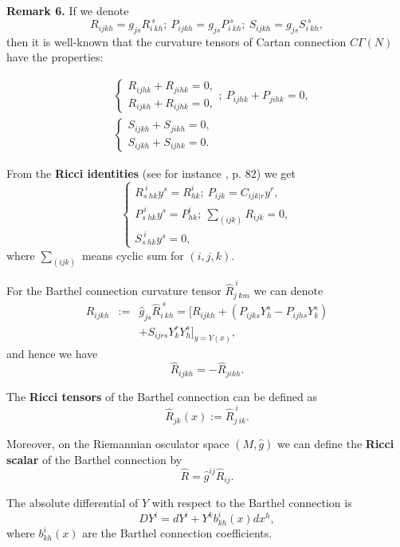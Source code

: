 \documentclass[aps,superscriptaddress, showpacs,preprintnumbers, superscriptaddress, nofootinbibt,twocolumn]{revtex4-2}
\def\bea{\begin{eqnarray}}
\def\eea{\end{eqnarray}}
\begin{document}
{\bf Remark 6.}
If we denote
$$
R_{ijkh}=g_{js}R_{i\ kh}^{\ s};\ P_{ijkh}=g_{js}P_{i\ kh}^{\ s};
\ S_{ijkh}=g_{js}S_{i\ kh}^{\ s},
$$
then it is well-known that the curvature tensors of Cartan connection $C\Gamma(N)$ have the properties:

\begin{equation*}
\begin{split}
&\begin{cases}
R_{ijhk}+R_{jihk}=0,\\
R_{ijkh}+R_{ijhk}=0,
\end{cases};\
P_{ijhk}+P_{jihk}=0,\\
&\begin{cases}
S_{ijkh}+S_{jikh}=0,\\
S_{ijkh}+S_{ijhk}=0.
\end{cases}
\end{split}
\end{equation*}

From the {\bf Ricci identities} (see for instance \cite{Ing3}, p. 82) we get
\begin{equation*}
\begin{cases}
R_{s\ hk}^{\ i}y^s=R_{hk}^i; \ P_{ijk}=C_{ijk|r}y^r,\\
P_{s\ hk}^{\ i}y^s=P_{hk}^i;\ \sum_{(ijk)}R_{ijk}=0,\\
S_{s\ hk}^{\ i}y^s=0,
\end{cases}
\end{equation*}
where $\sum_{(ijk)}$ means cyclic sum for $(i,j,k)$.

For the Barthel connection curvature tensor $\hat{R}^{\ i}_{j\ km}$ we can denote
\bea
\hat{R}_{ijkh}&:=&\hat{g}_{js}\hat{R}_{i\ kh}^{\ s}=\Bigg[R_{ijkh}+\left(P_{ijks}Y_h^s-P_{ijhs}Y_k^s\right)\nonumber\\
&&+S_{ijrs}Y_k^rY_h^s\Bigg]_{y=Y(x)},
\eea
and hence we have
$$
\hat{R}_{ijkh}=-\hat{R}_{jikh}.
$$

The {\bf Ricci tensors} of the Barthel connection can be defined as
$$
\hat{R}_{jk}(x):=\hat{R}^{\ i}_{j\ ik}.
$$

Moreover, on the Riemannian osculator space $(M,\hat{g})$ we can define the {\bf Ricci scalar} of the Barthel connection by
$$
\hat{R}=\hat{g}^{ij}\hat{R}_{ij}.
$$

The absolute differential of $Y$ with respect to the Barthel connection is
\begin{equation}
DY^{i}=dY^{i}+Y^{k}b_{kh}^{i}( x) dx^{h},  \label{dif}
\end{equation}%
where $b_{kh}^{i}( x) $ are the Barthel connection
coefficients.
\end{document}
